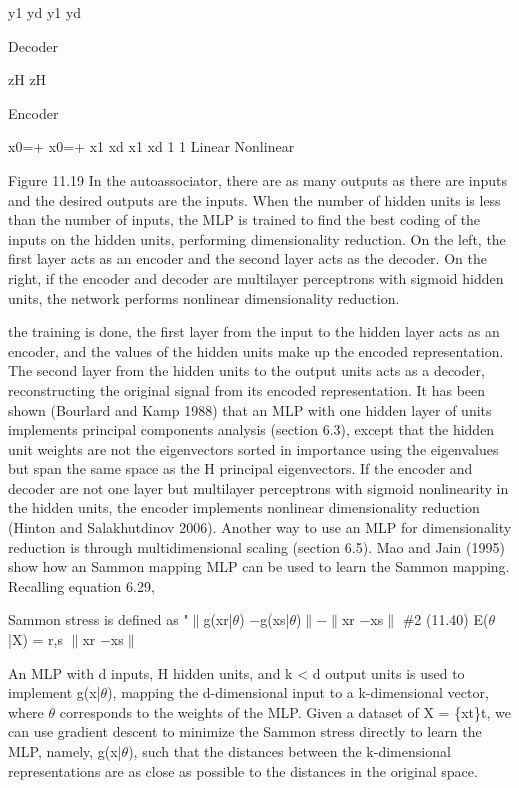 y1 yd y1 yd

Decoder

zH zH

Encoder

x0=+ x0=+ x1 xd x1 xd 1 1 Linear Nonlinear

Figure 11.19 In the autoassociator, there are as many outputs as there are inputs and the desired outputs are the inputs. When the number of hidden units is less than the number of inputs, the MLP is trained to find the best coding of the inputs on the hidden units, performing dimensionality reduction. On the left, the first layer acts as an encoder and the second layer acts as the decoder. On the right, if the encoder and decoder are multilayer perceptrons with sigmoid hidden units, the network performs nonlinear dimensionality reduction.

the training is done, the first layer from the input to the hidden layer acts as an encoder, and the values of the hidden units make up the encoded representation. The second layer from the hidden units to the output units acts as a decoder, reconstructing the original signal from its encoded representation. It has been shown (Bourlard and Kamp 1988) that an MLP with one hidden layer of units implements principal components analysis (section 6.3), except that the hidden unit weights are not the eigenvectors sorted in importance using the eigenvalues but span the same space as the H principal eigenvectors. If the encoder and decoder are not one layer but multilayer perceptrons with sigmoid nonlinearity in the hidden units, the encoder implements nonlinear dimensionality reduction (Hinton and Salakhutdinov 2006). Another way to use an MLP for dimensionality reduction is through multidimensional scaling (section 6.5). Mao and Jain (1995) show how an Sammon mapping MLP can be used to learn the Sammon mapping. Recalling equation 6.29,

Sammon stress is defined as "$\parallel$g(xr|$\theta$) $-$g(xs|$\theta$)$\parallel$$-$$\parallel$xr $-$xs$\parallel$ \#2 (11.40) E($\theta$|X) = r,s $\parallel$xr $-$xs$\parallel$

An MLP with d inputs, H hidden units, and k < d output units is used to implement g(x|$\theta$), mapping the d-dimensional input to a k-dimensional vector, where $\theta$ corresponds to the weights of the MLP. Given a dataset of X = \{xt\}t, we can use gradient descent to minimize the Sammon stress directly to learn the MLP, namely, g(x|$\theta$), such that the distances between the k-dimensional representations are as close as possible to the distances in the original space.

